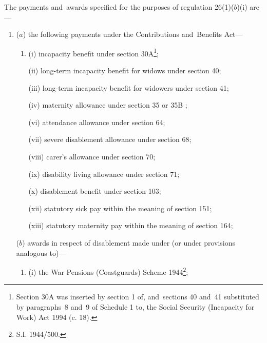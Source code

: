 \documentclass[12pt,a4paper]{article}
\begin{document}
The payments and~awards specified for the purposes of regulation 26(1)($b$)(i) are—
\begin{enumerate}\item[]
($a$) the following payments under the Contributions and~Benefits Act—
\begin{enumerate}\item[]
%
%

(i) incapacity benefit under section 30A\footnote{\frenchspacing Section 30A was inserted by section 1 of, and~sections 40 and~41 substituted by paragraphs~8 and~9 of Schedule 1 to, the Social Security (Incapacity for Work) Act 1994 (c. 18).};

(ii) long-term incapacity benefit for widows under section 40;

(iii) long-term incapacity benefit for widowers under section 41;

(iv) maternity allowance under section 35
or 35B%
;


(vi) attendance allowance under section 64;

(vii) severe disablement allowance under section 68;

(viii) 
carer's allowance  %
under section 70;

(ix) disability living allowance under section 71;

(x) disablement benefit under section 103;


(xii) statutory sick pay within the meaning of section 151;

(xiii) statutory maternity pay within the meaning of section 164;
\end{enumerate}

($b$) awards in respect of disablement made under (or under provisions analogous to)—
\begin{enumerate}\item[]
(i) the War Pensions (Coastguards) Scheme 1944\footnote{\frenchspacing S.I. 1944/500.};


\end{enumerate}
\end{enumerate}
\end{document}
